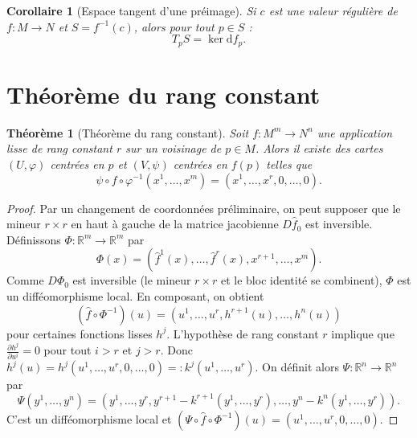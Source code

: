 \documentclass[12pt,a4paper,openany]{book}
\theoremstyle{definition}
\theoremstyle{plain}
\newtheorem{theoreme}[definition]{Théorème}
\newtheorem{corollaire}[definition]{Corollaire}
\theoremstyle{remark}
\newcommand{\R}{\mathbb{R}}
\newcommand{\dd}{\mathrm{d}}
\begin{document}
\begin{corollaire}[Espace tangent d'une préimage]\label{cor:tangent-preimage}
Si $c$ est une valeur régulière de $f : M \to N$ et $S = f^{-1}(c)$, alors
pour tout $p \in S$ :
\[
  T_pS = \ker \dd f_p.
\]
\end{corollaire}

\section{Théorème du rang constant}\label{sec:rang-constant}

\begin{theoreme}[Théorème du rang constant]\label{thm:rang-constant}
Soit $f : M^m \to N^n$ une application lisse de rang constant $r$ sur un
voisinage de $p \in M$. Alors il existe des cartes $(U, \varphi)$ centrées en $p$
et $(V, \psi)$ centrées en $f(p)$ telles que
\[
  \psi \circ f \circ \varphi^{-1}(x^1, \ldots, x^m) = (x^1, \ldots, x^r, 0, \ldots, 0).
\]
\end{theoreme}

\begin{proof}
Par un changement de coordonnées préliminaire, on peut supposer que le mineur
$r \times r$ en haut à gauche de la matrice jacobienne $D\hat{f}_0$ est inversible.
Définissons $\Phi : \R^m \to \R^m$ par
\[
  \Phi(x) = (\hat{f}^1(x), \ldots, \hat{f}^r(x), x^{r+1}, \ldots, x^m).
\]
Comme $D\Phi_0$ est inversible (le mineur $r \times r$ et le bloc identité
se combinent), $\Phi$ est un difféomorphisme local. En composant, on obtient
\[
  (\hat{f} \circ \Phi^{-1})(u) = (u^1, \ldots, u^r, h^{r+1}(u), \ldots, h^n(u))
\]
pour certaines fonctions lisses $h^j$. L'hypothèse de rang constant $r$ implique
que $\frac{\partial h^j}{\partial u^i} = 0$ pour tout $i > r$ et $j > r$.
Donc $h^j(u) = h^j(u^1, \ldots, u^r, 0, \ldots, 0) =: k^j(u^1, \ldots, u^r)$.
On définit alors $\Psi : \R^n \to \R^n$ par
\[
  \Psi(y^1, \ldots, y^n) = (y^1, \ldots, y^r, y^{r+1} - k^{r+1}(y^1, \ldots, y^r),
  \ldots, y^n - k^n(y^1, \ldots, y^r)).
\]
C'est un difféomorphisme local et
$(\Psi \circ \hat{f} \circ \Phi^{-1})(u) = (u^1, \ldots, u^r, 0, \ldots, 0)$.
\end{proof}
\end{document}
